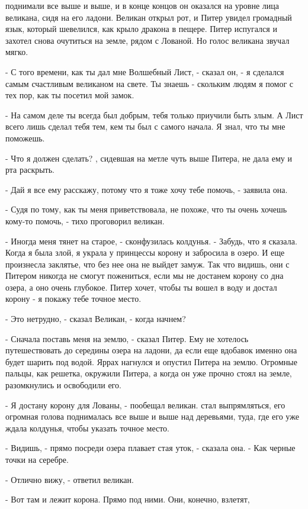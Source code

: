 поднимали все выше и выше, и в конце концов он оказался на уровне лица 
великана, сидя на его ладони. Великан открыл рот, и Питер увидел 
громадный язык, который шевелился, как крыло дракона в пещере. Питер 
испугался и захотел снова очутиться на земле, рядом с Лованой. Но 
голос великана звучал мягко.
\par- С того времени, как ты дал мне Волшебный Лист, - сказал он, - я 
сделался самым счастливым великаном на свете. Ты знаешь - скольким 
людям я помог с тех пор, как ты посетил мой замок.
\par- На самом деле ты всегда был добрым, тебя только приучили быть 
злым. А Лист всего лишь сделал тебя тем, кем ты был с самого начала. Я 
знал, что ты мне поможешь.
\par- Что я должен сделать?
, сидевшая на метле чуть выше Питера, не дала ему и рта 
раскрыть.
\par- Дай я все ему расскажу, потому что я тоже хочу тебе помочь, - 
заявила она.
\par- Судя по тому, как ты меня приветствовала, не похоже, что ты 
очень хочешь кому-то помочь, - тихо проговорил великан.
\par- Иногда меня тянет на старое, - сконфузилась колдунья. - Забудь, 
что я сказала. Когда я была злой, я украла у принцессы корону и 
забросила в озеро. И еще произнесла заклятье, что без нее она не 
выйдет замуж. Так что видишь, они с Питером никогда не смогут 
пожениться, если мы не достанем корону со дна озера, а оно очень 
глубокое. Питер хочет, чтобы ты вошел в воду и достал корону - я 
покажу тебе точное место.
\par- Это нетрудно, - сказал Великан, - когда начнем?
\par- Сначала поставь меня на землю, - сказал Питер. Ему не хотелось 
путешествовать до середины озера на ладони, да если еще вдобавок 
именно она будет шарить под водой.
 Яррах нагнулся и опустил Питера на землю. Огромные пальцы, 
как решетка, окружили Питера, а когда он уже прочно стоял на земле, 
разомкнулись и освободили его.
\par- Я достану корону для Лованы, - пообещал великан.
 стал выпрямляться, его огромная голова поднималась все выше 
и выше над деревьями, туда, где его уже ждала колдунья, чтобы указать 
точное место.
\par- Видишь, - прямо посреди озера плавает стая уток, - сказала она. 
- Как черные точки на серебре.
\par- Отлично вижу, - ответил великан.
\par- Вот там и лежит корона. Прямо под ними. Они, конечно, взлетят, 
